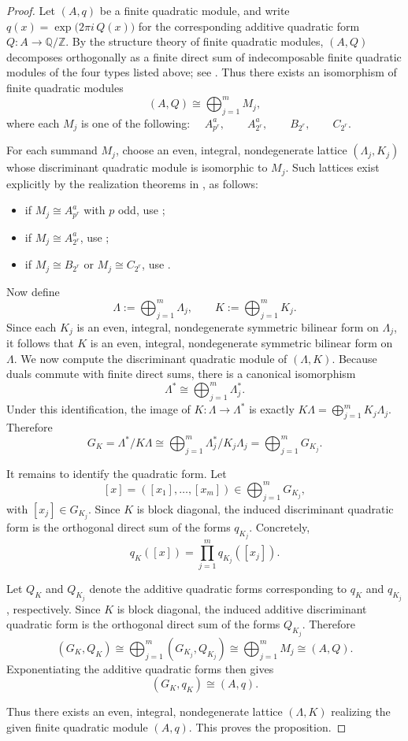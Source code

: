 \documentclass[12pt]{amsart}
\numberwithin{equation}{section}
\begin{document}
\begin{proof}
Let $(A,q)$ be a finite quadratic module, and write $q(x)=\exp\!\bigl(2\pi i\,Q(x)\bigr)$ for the corresponding additive quadratic form $Q \colon A \to \mathbb{Q}/\mathbb{Z}.$
By the structure theory of finite quadratic modules, $(A,Q)$ decomposes orthogonally as a
finite direct sum of indecomposable finite quadratic modules of the four types listed above;
see \cite[Definition~3.11 and Theorem~3.19]{Zhu2021}. Thus there exists an isomorphism
of finite quadratic modules
\[
(A,Q)\cong \bigoplus_{j=1}^m M_j,
\]
where each $M_j$ is one of the following: $\quad
A_{p^r}^a,\qquad A_{2^r}^a,\qquad B_{2^r},\qquad C_{2^r}.$

For each summand $M_j$, choose an even, integral, nondegenerate lattice
$(\Lambda_j,K_j)$ whose discriminant quadratic module is isomorphic to $M_j$.
Such lattices exist explicitly by the realization theorems in \cite[Section 4]{Zhu2021}, as follows:

\begin{itemize}
\item if $M_j\cong A_{p^r}^a$ with $p$ odd, use \cite[Theorem~4.2]{Zhu2021};
\item if $M_j\cong A_{2^r}^a$, use \cite[Theorem~4.5]{Zhu2021};
\item if $M_j\cong B_{2^r}$ or $M_j\cong C_{2^r}$, use \cite[Theorem~4.7]{Zhu2021}.
\end{itemize}

Now define
\[
\Lambda:=\bigoplus_{j=1}^m \Lambda_j,
\qquad
K:=\bigoplus_{j=1}^m K_j.
\]
Since each $K_j$ is an even, integral, nondegenerate symmetric bilinear form on
$\Lambda_j$, it follows that $K$ is an even, integral, nondegenerate symmetric bilinear
form on $\Lambda$. We now compute the discriminant quadratic module of $(\Lambda,K)$.
Because duals commute with finite direct sums, there is a canonical isomorphism
\[
\Lambda^*
\cong
\bigoplus_{j=1}^m \Lambda_j^*.
\]
Under this identification, the image of $K \colon \Lambda \to \Lambda^*$
is exactly $K\Lambda
=
\bigoplus_{j=1}^m K_j\Lambda_j.$
Therefore
\[
G_K
=
\Lambda^*/K\Lambda
\cong
\bigoplus_{j=1}^m \Lambda_j^*/K_j\Lambda_j
=
\bigoplus_{j=1}^m G_{K_j}.
\]

It remains to identify the quadratic form. Let
\[
[x]=([x_1],\dots,[x_m])\in \bigoplus_{j=1}^m G_{K_j},
\]
with $[x_j]\in G_{K_j}$. Since $K$ is block diagonal, the induced discriminant quadratic
form is the orthogonal direct sum of the forms $q_{K_j}$. Concretely,
\[
q_K([x])
=
\prod_{j=1}^m q_{K_j}([x_j]).
\]

Let $Q_K$ and $Q_{K_j}$ denote the additive quadratic forms corresponding to
$q_K$ and $q_{K_j}$, respectively. Since $K$ is block diagonal, the induced
additive discriminant quadratic form is the orthogonal direct sum of the forms
$Q_{K_j}$. Therefore
\[
(G_K,Q_K)
\cong
\bigoplus_{j=1}^m (G_{K_j},Q_{K_j})
\cong
\bigoplus_{j=1}^m M_j
\cong
(A,Q).
\]
Exponentiating the additive quadratic forms then gives
\[
(G_K,q_K)\cong (A,q).
\]

Thus there exists an even, integral, nondegenerate lattice $(\Lambda,K)$ realizing the
given finite quadratic module $(A,q)$. This proves the proposition.
\end{proof}
\end{document}
